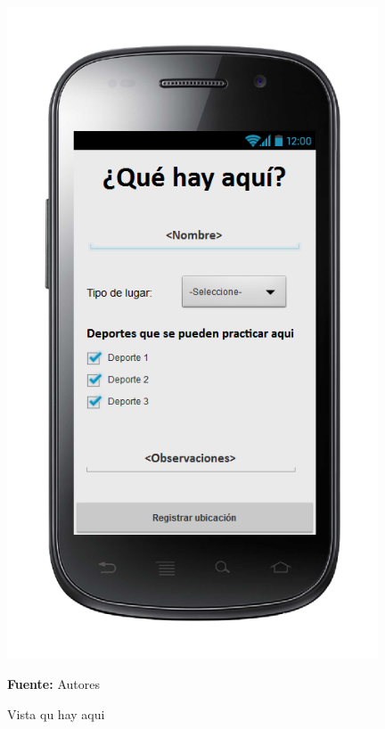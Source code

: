 \begin{figure}[!htb]
  \begin{center}
\includegraphics[width=11cm]{./imagenes/UI/Ubicacion/que_hay_aqui.png}
    \caption{Vista qu hay aqui}
    \label{fig:Vista_que_hay_aqui}
    \textbf{Fuente:}  Autores
  \end{center}
\end{figure}
